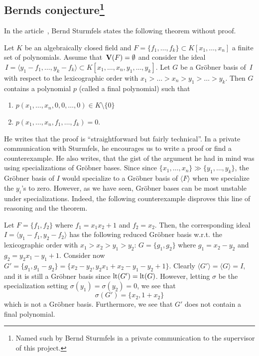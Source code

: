 \subsection[Bernds conjecture]{Bernds conjecture\footnote{Named such by Bernd Sturmfels in a private communication to the supervisor of this project.}}\label{sec:bernd}
In the article~\cite{sturmfels}, Bernd Sturmfels states the following theorem without proof.

\begin{theorem}
  Let $K$ be an algebraically closed field and $F = \{f_{1}, \dots, f_{k}\} \subset K[x_{1}, \dots, x_{n}]$ a finite set of polynomials. Assume that $\,\operatorname{\mathbf V}(F) = \emptyset$ and consider the ideal $\,I = \langle y_{1} - f_{1}, \dots, y_{k} - f_{k} \rangle \subset K[x_{1}, \dots, x_{n}, y_{1}, \dots, y_{k}]$. Let $G$ be a Gröbner basis of $\,I$ with respect to the lexicographic order with $x_{1} > \dots > x_{n} > y_{1} > \dots > y_{k}$. Then $G$ contains a polynomial $p$ (called a final polynomial) such that
  \begin{enumerate}
    \item $p(x_{1}, \dots, x_{n}, 0, 0, \dots, 0) \in K \setminus \{0\}$
    \item $p(x_{1}, \dots, x_{n}, f_{1}, \dots, f_{k}) = 0$.
  \end{enumerate}
\end{theorem}

He writes that the proof is ``straightforward but fairly technical''. In a private communication\cite{NL_to_BS} with Sturmfels, he encourages us to write a proof or find a counterexample. He also writes, that the gist of the argument he had in mind was using specializations of Gröbner bases. Since since $\{x_{1}, \dots, x_{n}\} \gg \{y_{1}, \dots, y_{k}\}$, the Gröbner basis of $I$ would specialize to a Gröbner basis of $\langle F \rangle$ when we specialize the $y_{i}$'s to zero. However, as we have seen, Gröbner bases can be most unstable under specializations. Indeed, the following counterexample disproves this line of reasoning and the theorem.

\begin{example}\upshape
  Let $F = \{f_{1}, f_{2}\}$ where $f_{1} = x_{1} x_{2} + 1$ and $f_{2} = x_{2}$. Then, the corresponding ideal
  $I = \langle y_{1} - f_{1}, y_{2} - f_{2} \rangle$ has the following reduced Gröbner basis w.r.t. the lexicographic order with $x_{1} > x_{2} > y_{1} > y_{2}$: $G =  \{g_{1}, g_{2}\}$ where $g_{1} = x_{2} - y_{2}$ and $ g_{2} = y_{2}x_{1} - y_{1} + 1$. Consider now $G' = \{g_{1}, g_{1} - g_{2}\} = \{x_{2} - y_{2}, y_{2}x_{1} + x_{2} - y_{1} - y_{2} + 1\}$. Clearly $\langle G' \rangle = \langle G \rangle = I$, and it is still a Gröbner basis since $\operatorname{lt}(G') = \operatorname{lt}(G)$. However, letting $\sigma$ be the specialization setting $\sigma(y_{1}) = \sigma(y_{2}) = 0$, we see that
  \[\sigma(G') = \{x_{2}, 1+x_{2}\}\]
  which is not a Gröbner basis. Furthermore, we see that $G'$ does not contain a final polynomial.
\end{example}

